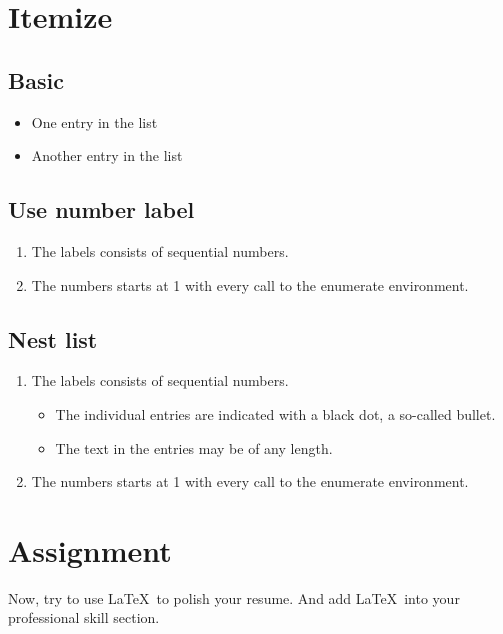 \documentclass[12pt]{article}
\begin{document}
\section{Itemize}
\subsection{Basic}
\begin{itemize}
  \item One entry in the list
  \item Another entry in the list
\end{itemize}

\subsection{Use number label}
\begin{enumerate}
  \item The labels consists of sequential numbers.
  \item The numbers starts at 1 with every call to the enumerate environment.
\end{enumerate}


\subsection{Nest list}
\begin{enumerate}
   \item The labels consists of sequential numbers.
   \begin{itemize}
     \item The individual entries are indicated with a black dot, a so-called bullet.
     \item The text in the entries may be of any length.
   \end{itemize}
   \item The numbers starts at 1 with every call to the enumerate environment.
\end{enumerate}

\section{Assignment}
Now, try to use \LaTeX \ to polish your resume. And add \LaTeX \ into your professional skill section. 
\end{document}
